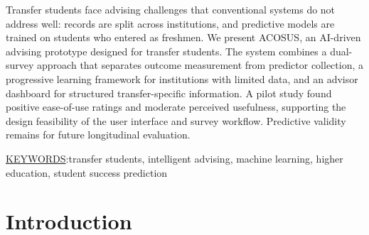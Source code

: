 \documentclass[letterpaper,11pt]{article}
\begin{document}

Transfer students face advising challenges that conventional systems do not address well: records are split across institutions, and predictive models are trained on students who entered as freshmen. We present ACOSUS, an AI-driven advising prototype designed for transfer students. The system combines a dual-survey approach that separates outcome measurement from predictor collection, a progressive learning framework for institutions with limited data, and an advisor dashboard for structured transfer-specific information. A pilot study found positive ease-of-use ratings and moderate perceived usefulness, supporting the design feasibility of the user interface and survey workflow. Predictive validity remains for future longitudinal evaluation.

\bigskip

\noindent\underline{KEYWORDS}:\quad transfer students, intelligent advising, machine learning, higher education, student success prediction

\section{Introduction}\label{sec:introduction}
\end{document}

